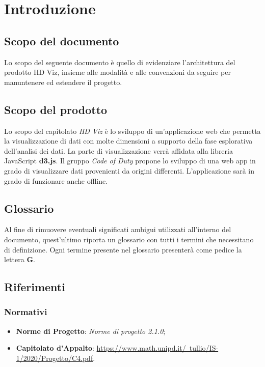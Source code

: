 \section{Introduzione}

    \subsection{Scopo del documento}
    Lo scopo del seguente documento è quello di evidenziare l'architettura del prodotto HD Viz, insieme alle modalità e alle convenzioni da seguire per manuntenere ed estendere il progetto.
    
    \subsection{Scopo del prodotto}
    Lo scopo del capitolato \emph{HD Viz} è lo sviluppo di un'applicazione web che permetta la visualizzazione di dati con molte dimensioni a supporto della fase esplorativa dell'analisi dei dati. La parte di visualizzazione verrà affidata alla libreria JavaScript \textbf{d3.js}. Il gruppo \emph{Code of Duty} propone lo sviluppo di una web app in grado di visualizzare dati provenienti da origini differenti. L'applicazione sarà in grado di funzionare anche offline.
    
    \subsection{Glossario}
    Al fine di rimuovere eventuali significati ambigui utilizzati all'interno del documento, quest'ultimo riporta un glossario con tutti i termini che necessitano di definizione. Ogni termine presente nel glossario presenterà come pedice la lettera \textbf{G}.
    
    \subsection{Riferimenti}
	\subsubsection{Normativi}
	\begin{itemize}
		\item \textbf{Norme di Progetto}: \textit{Norme di progetto 2.1.0};
        \item \textbf{Capitolato d'Appalto}: \href{https://www.math.unipd.it/~tullio/IS-1/2020/Progetto/C4.pdf}{https://www.math.unipd.it/~tullio/IS-1/2020/Progetto/C4.pdf}.
	\end{itemize}
